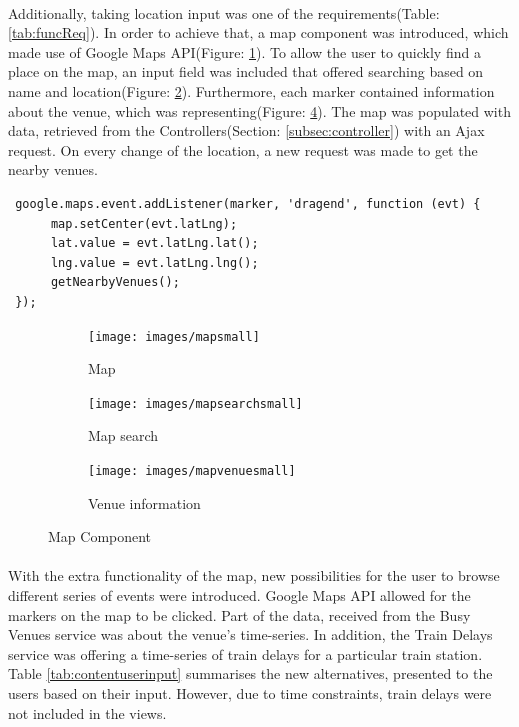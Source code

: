 \documentclass{l4proj}
\begin{document}
\paragraph{}
Additionally, taking location input was one of the requirements(Table: \ref{tab:funcReq}). In order to achieve that, a map component was introduced, which made use of Google Maps API(Figure: \ref{mapsmall}). To allow the user to quickly find a place on the map, an input field was included that offered searching based on name and location(Figure: \ref{mapsearchsmall}). Furthermore, each marker contained information about the venue, which was representing(Figure: \ref{mapvenuessmall}). The map was populated with data, retrieved from the Controllers(Section: \ref{subsec:controller}) with an Ajax request. On every change of the location, a new request was made to get the nearby venues.

\begin{lstlisting}
 google.maps.event.addListener(marker, 'dragend', function (evt) {
	  map.setCenter(evt.latLng);
	  lat.value = evt.latLng.lat();
	  lng.value = evt.latLng.lng();
	  getNearbyVenues();
 });
\end{lstlisting}

\begin{figure}[H]
	\centering
	\begin{subfigure}{.3\textwidth}
		\texttt{[image: images/mapsmall]}
		\caption{Map}
		\label{mapsmall}
	\end{subfigure}
	\begin{subfigure}{.3\textwidth}
		\texttt{[image: images/mapsearchsmall]}
		\caption{Map search}
		\label{mapsearchsmall}
	\end{subfigure}
	\begin{subfigure}{.3\textwidth}
		\texttt{[image: images/mapvenuesmall]}
		\caption{Venue information}
		\label{mapvenuessmall}
	\end{subfigure}
	\caption{Map Component}
\end{figure}

\paragraph{}
With the extra functionality of the map, new possibilities for the user to browse different series of events were introduced. Google Maps API allowed for the markers on the map to be clicked. Part of the data, received from the Busy Venues service was about the venue's time-series. In addition, the Train Delays service was offering a time-series of train delays for a particular train station. Table \ref{tab:contentuserinput} summarises the new alternatives, presented to the users based on their input. However, due to time constraints, train delays were not included in the views. 
\end{document}
